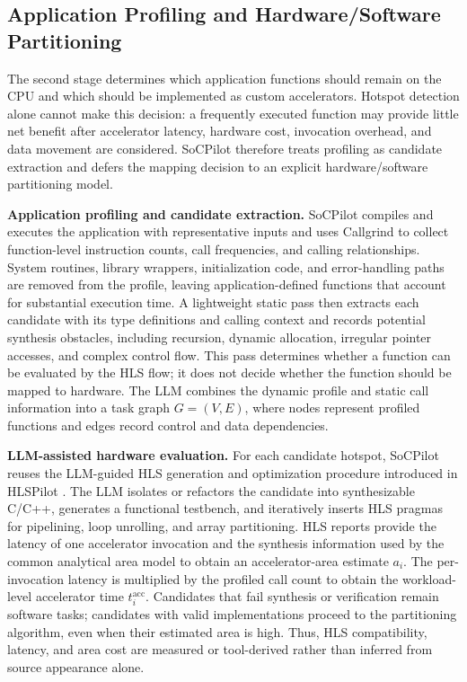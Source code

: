 \subsection{Application Profiling and Hardware/Software Partitioning}
The second stage determines which application functions should remain on the CPU and which should be implemented as custom accelerators. Hotspot detection alone cannot make this decision: a frequently executed function may provide little net benefit after accelerator latency, hardware cost, invocation overhead, and data movement are considered. SoCPilot therefore treats profiling as candidate extraction and defers the mapping decision to an explicit hardware/software partitioning model.

\textbf{Application profiling and candidate extraction.}
SoCPilot compiles and executes the application with representative inputs and uses Callgrind to collect function-level instruction counts, call frequencies, and calling relationships. System routines, library wrappers, initialization code, and error-handling paths are removed from the profile, leaving application-defined functions that account for substantial execution time. A lightweight static pass then extracts each candidate with its type definitions and calling context and records potential synthesis obstacles, including recursion, dynamic allocation, irregular pointer accesses, and complex control flow. This pass determines whether a function can be evaluated by the HLS flow; it does not decide whether the function should be mapped to hardware. The LLM combines the dynamic profile and static call information into a task graph $G=(V,E)$, where nodes represent profiled functions and edges record control and data dependencies.

\textbf{LLM-assisted hardware evaluation.}
For each candidate hotspot, SoCPilot reuses the LLM-guided HLS generation and optimization procedure introduced in HLSPilot \cite{xiong2024hlspilot}. The LLM isolates or refactors the candidate into synthesizable C/C++, generates a functional testbench, and iteratively inserts HLS pragmas for pipelining, loop unrolling, and array partitioning. HLS reports provide the latency of one accelerator invocation and the synthesis information used by the common analytical area model to obtain an accelerator-area estimate $a_i$. The per-invocation latency is multiplied by the profiled call count to obtain the workload-level accelerator time $t_i^{\mathrm{acc}}$. Candidates that fail synthesis or verification remain software tasks; candidates with valid implementations proceed to the partitioning algorithm, even when their estimated area is high. Thus, HLS compatibility, latency, and area cost are measured or tool-derived rather than inferred from source appearance alone.

